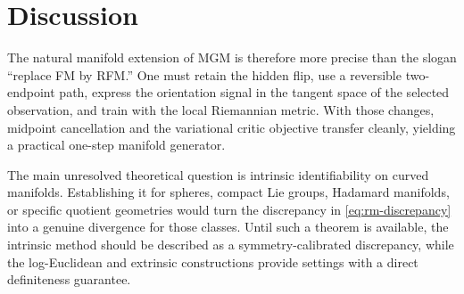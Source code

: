 \documentclass[10pt,twocolumn]{article}
\begin{document}
\section{Discussion}

The natural manifold extension of MGM is therefore more precise than the slogan ``replace FM by RFM.'' One must retain the hidden flip, use a reversible two-endpoint path, express the orientation signal in the tangent space of the selected observation, and train with the local Riemannian metric. With those changes, midpoint cancellation and the variational critic objective transfer cleanly, yielding a practical one-step manifold generator.

The main unresolved theoretical question is intrinsic identifiability on curved manifolds. Establishing it for spheres, compact Lie groups, Hadamard manifolds, or specific quotient geometries would turn the discrepancy in \cref{eq:rm-discrepancy} into a genuine divergence for those classes. Until such a theorem is available, the intrinsic method should be described as a symmetry-calibrated discrepancy, while the log-Euclidean and extrinsic constructions provide settings with a direct definiteness guarantee.



\end{document}
